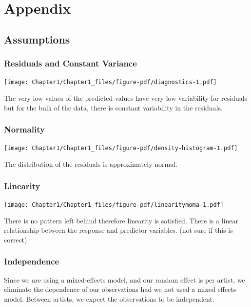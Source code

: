 \documentclass[
  letterpaper,
  DIV=11,
  numbers=noendperiod]{scrreprt}
\begin{document}
\hypertarget{appendix}{%
\chapter{Appendix}\label{appendix}}

\hypertarget{assumptions}{%
\section{Assumptions}\label{assumptions}}

\hypertarget{residuals-and-constant-variance}{%
\subsection{Residuals and Constant
Variance}\label{residuals-and-constant-variance}}

\texttt{[image: Chapter1/Chapter1\_files/figure-pdf/diagnostics-1.pdf]}

The very low values of the predicted values have very low variability
for residuals but for the bulk of the data, there is constant
variability in the residuals.

\hypertarget{normality}{%
\subsection{Normality}\label{normality}}

\texttt{[image: Chapter1/Chapter1\_files/figure-pdf/density-histogram-1.pdf]}

The distribution of the residuals is approximately normal.

\hypertarget{linearity}{%
\subsection{Linearity}\label{linearity}}

\texttt{[image: Chapter1/Chapter1\_files/figure-pdf/linearitymoma-1.pdf]}

There is no pattern left behind therefore linearity is satisfied. There
is a linear relationship between the response and predictor variables.
(not sure if this is correct)

\hypertarget{independence}{%
\subsection{Independence}\label{independence}}

Since we are using a mixed-effects model, and our random effect is per
artist, we eliminate the dependence of our observations had we not used
a mixed effects model. Between artists, we expect the observations to be
independent.
\end{document}
